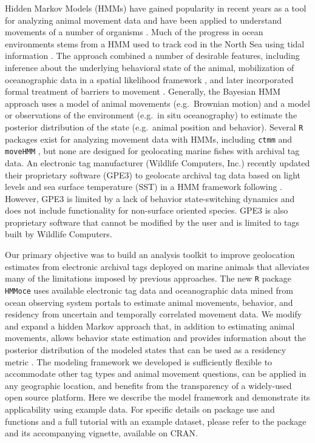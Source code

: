 Hidden Markov Models (HMMs) have gained popularity in recent years as a
tool for analyzing animal movement data and have been applied to
understand movements of a number of organisms
\citep{Holzmann2006, Thygesen2009a, Pedersen2011}. Much of the progress
in ocean environments stems from a HMM used to track cod in the North
Sea using tidal information \citep{Pedersen2008}. The approach combined
a number of desirable features, including inference about the underlying
behavioral state of the animal, mobilization of oceanographic data in a
spatial likelihood framework \citep{Nielsen2006}, and later incorporated
formal treatment of barriers to movement \citep{Pedersen2011}.
Generally, the Bayesian HMM approach uses a model of animal movements
(e.g.~Brownian motion) and a model or observations of the environment
(e.g.~in situ oceanography) to estimate the posterior distribution of
the state (e.g.~animal position and behavior). Several \texttt{R}
packages exist for analyzing movement data with HMMs, including
\texttt{ctmm} \citep{Calabrese2016} and \texttt{moveHMM}
\citep{Michelot2016}, but none are designed for geolocating marine
fishes with archival tag data. An electronic tag manufacturer (Wildlife
Computers, Inc.) recently updated their proprietary software (GPE3) to
geolocate archival tag data based on light levels and sea surface
temperature (SST) in a HMM framework following \citet{Pedersen2008}.
However, GPE3 is limited by a lack of behavior state-switching dynamics
and does not include functionality for non-surface oriented species.
GPE3 is also proprietary software that cannot be modified by the user
and is limited to tags built by Wildlife Computers.

Our primary objective was to build an analysis toolkit to improve
geolocation estimates from electronic archival tags deployed on marine
animals that alleviates many of the limitations imposed by previous
approaches. The new \texttt{R} package \texttt{HMMoce} uses available
electronic tag data and oceanographic data mined from ocean observing
system portals to estimate animal movements, behavior, and residency
from uncertain and temporally correlated movement data. We modify and
expand a hidden Markov approach
\citep{Thygesen2009a, Pedersen2008, Pedersen2011} that, in addition to
estimating animal movements, allows behavior state estimation and
provides information about the posterior distribution of the modeled
states that can be used as a residency metric \citep{Pedersen2011}. The
modeling framework we developed is sufficiently flexible to accommodate
other tag types and animal movement questions, can be applied in any
geographic location, and benefits from the transparency of a widely-used
open source platform. Here we describe the model framework and
demonstrate its applicability using example data. For specific details
on package use and functions and a full tutorial with an example
dataset, please refer to the package and its accompanying vignette,
available on CRAN.

